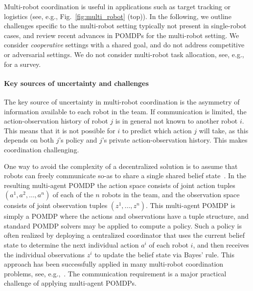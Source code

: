 \documentclass[journal]{IEEEtran}
\begin{document}
Multi-robot coordination is useful in applications such as target tracking or logistics (see, e.g., Fig.~\ref{fig:multi_robot} (top)).
In the following, we outline challenges specific to the multi-robot setting typically not present in single-robot cases, and review recent advances in POMDPs for the multi-robot setting.
We consider \emph{cooperative} settings with a shared goal, and do not address competitive or adversarial settings.
{We do not consider multi-robot task allocation, see, e.g.,~\cite{korsah2013comprehensive} for a survey.}

\paragraph{Key sources of uncertainty and challenges}
The key source of uncertainty in multi-robot coordination is the asymmetry of information available to each robot in the team.
If communication is limited, the action-observation history of robot $j$ is in general not known to another robot $i$.
This means that it is not possible for $i$ to predict which action $j$ will take, as this depends on both $j$'s policy and $j$'s private action-observation history.
This makes coordination challenging.

{One way to avoid the complexity of a decentralized solution is to assume that robots can freely communicate so-as to share a single shared belief state~\cite[Sec.~2.4.3.]{oliehoek2016concise}. In the resulting multi-agent POMDP} the action space consists of joint action tuples $(a^1, a^2, \ldots, a^n)$ of each of the $n$ robots in the team, and the observation space consists of joint observation tuples $(z^1, \ldots, z^n)$.
{This multi-agent POMDP is simply a POMDP where the actions and observations have a tuple structure, and standard POMDP solvers may be applied to compute a policy.}
%
%
%
%
{Such a policy is often realized by deploying} a centralized coordinator that uses the current belief state to determine the next individual action $a^i$ of each robot $i$, and then receives the individual observations $z^i$ to update the belief state via Bayes' rule.
This approach has been successfully applied in many multi-robot coordination problems, see, e.g.,~\cite{spaan2008cooperative,spaan2010active,ahmadi2019safe,corah2019distributed,viseras2019deepig,yi2019indoor,bhattacharya2020multiagent}.
The communication requirement is a major practical challenge of applying multi-agent POMDPs.
%
\end{document}
